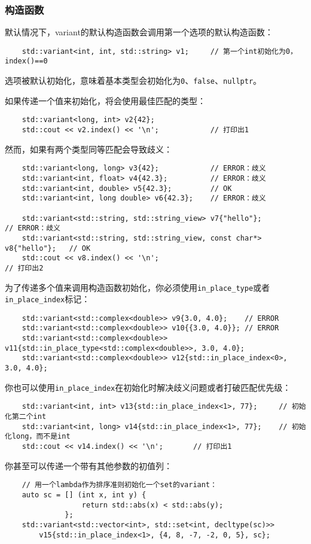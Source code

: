 \subsubsection{构造函数}
默认情况下，variant的默认构造函数会调用第一个选项的默认构造函数：
\begin{lstlisting}
    std::variant<int, int, std::string> v1;     // 第一个int初始化为0，index()==0
\end{lstlisting}
选项被默认初始化，意味着基本类型会初始化为\texttt{0}、\texttt{false}、\texttt{nullptr}。

如果传递一个值来初始化，将会使用最佳匹配的类型：
\begin{lstlisting}
    std::variant<long, int> v2{42};
    std::cout << v2.index() << '\n';            // 打印出1
\end{lstlisting}
然而，如果有两个类型同等匹配会导致歧义：
\begin{lstlisting}
    std::variant<long, long> v3{42};            // ERROR：歧义
    std::variant<int, float> v4{42.3};          // ERROR：歧义
    std::variant<int, double> v5{42.3};         // OK
    std::variant<int, long double> v6{42.3};    // ERROR：歧义

    std::variant<std::string, std::string_view> v7{"hello"};                // ERROR：歧义
    std::variant<std::string, std::string_view, const char*> v8{"hello"};   // OK
    std::cout << v8.index() << '\n';                                        // 打印出2
\end{lstlisting}
为了传递多个值来调用构造函数初始化，你必须使用\texttt{in\_place\_type}或者
\texttt{in\_place\_index}标记：
\begin{lstlisting}
    std::variant<std::complex<double>> v9{3.0, 4.0};    // ERROR
    std::variant<std::complex<double>> v10{{3.0, 4.0}}; // ERROR
    std::variant<std::complex<double>> v11{std::in_place_type<std::complex<double>>, 3.0, 4.0};
    std::variant<std::complex<double>> v12{std::in_place_index<0>, 3.0, 4.0};
\end{lstlisting}
你也可以使用\texttt{in\_place\_index}在初始化时解决歧义问题或者打破匹配优先级：
\begin{lstlisting}
    std::variant<int, int> v13{std::in_place_index<1>, 77};     // 初始化第二个int
    std::variant<int, long> v14{std::in_place_index<1>, 77};    // 初始化long，而不是int
    std::cout << v14.index() << '\n';       // 打印出1
\end{lstlisting}
你甚至可以传递一个带有其他参数的初值列：
\begin{lstlisting}
    // 用一个lambda作为排序准则初始化一个set的variant：
    auto sc = [] (int x, int y) {
                  return std::abs(x) < std::abs(y);
              };
    std::variant<std::vector<int>, std::set<int, decltype(sc)>>
        v15{std::in_place_index<1>, {4, 8, -7, -2, 0, 5}, sc};
\end{lstlisting}
